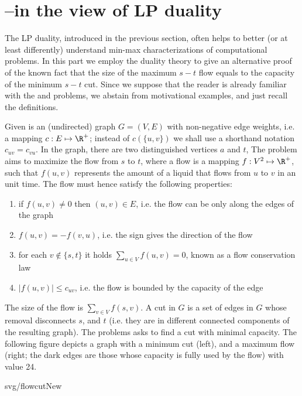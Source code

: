 \newpage
\section{\maxflow--\mincut in the view of LP duality}

\noindent 
The LP duality, introduced in the previous section, often helps to better (or at least differently)
understand min-max characterizations of computational problems. In this part we employ the duality 
theory to give an alternative proof of the known fact that the size of the maximum $s-t$ flow equals to 
the capacity of the minimum $s-t$ cut. Since we suppose that the reader is already familiar with the 
\maxflow and \mincut problems, we abstain from motivational examples, and just recall the definitions.

\noindent
Given is an (undirected) graph $G=(V,E)$ with non-negative edge weights, i.e.
a mapping $c:E\mapsto\R^+$; instead of  $c(\{u,v\})$ we shall use a shorthand notation
$c_{uv}=c_{vu}$. In the graph, there are two distinguished vertices $a$ and $t$,
The \maxflow problem aims to maximize the flow from $s$ to $t$, where a flow is a mapping
$f:V^2\mapsto\R^+$, such that $f(u,v)$ represents the amount of a liquid that flows
from $u$ to $v$ in an unit time. The flow must hence satisfy the following properties:
\begin{enumerate}
  \item if $f(u,v)\not=0$ then  $(u,v)\in E$, i.e. the flow can be only along the edges of the graph
  \item $f(u,v)=-f(v,u)$, i.e. the sign gives the direction of the flow
  \item for each $v\not\in\{s,t\}$ it holds $\sum\limits_{u\in V}f(u,v)=0$, 
  known as a flow conservation law
  \item $|f(u,v)|\le c_{uv}$, i.e. the flow is bounded by the capacity of the edge
\end{enumerate}
\noindent
The size of the flow is  $\sum_{v\in V}f(s,v)$. 
A cut in $G$ is a set of edges in $G$ whose removal disconnects $s$, and $t$ (i.e. they are in different
connected components of the resulting graph). The \mincut problems asks to find a cut with minimal capacity.
The following figure depicts a graph with a minimum cut (left), and a maximum flow (right; the dark edges 
are those whose capacity is fully used by the flow) with value 24.


\begin{myfig}{\textwidth}{svg/flowcutNew}
\end{myfig}


